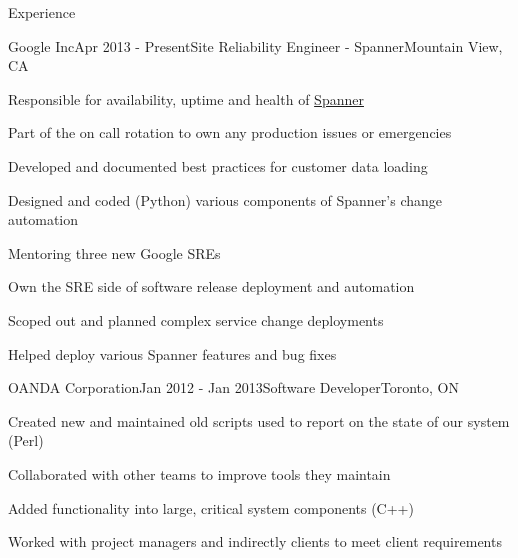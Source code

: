 \documentclass{resume}
\begin{document}
  \begin{rSection}{Experience}
    \begin{rSubsection}{Google Inc}{Apr 2013 - Present}{Site Reliability Engineer - Spanner}{Mountain View, CA}
      \item Responsible for availability, uptime and health of \href{https://en.wikipedia.org/wiki/Spanner_(database)}{Spanner}
      \item Part of the on call rotation to own any production issues or emergencies
      \item Developed and documented best practices for customer data loading
      \item Designed and coded (Python) various components of Spanner's change automation
      \item Mentoring three new Google SREs 
      \item Own the SRE side of software release deployment and automation
      \item Scoped out and planned complex service change deployments
      \item Helped deploy various Spanner features and bug fixes
    \end{rSubsection}

    \begin{rSubsection}{OANDA Corporation}{Jan 2012 - Jan 2013}{Software Developer}{Toronto, ON}
      \item Created new and maintained old scripts used to report on the state of our system (Perl)
      \item Collaborated with other teams to improve tools they maintain
      \item Added functionality into large, critical system components (C++)
      \item Worked with project managers and indirectly clients to meet client requirements
    \end{rSubsection}

\begin{comment}
    \begin{rSubsection}{OANDA Corporation}{Jan 2012 - Mar 2012}{Integrator}{Toronto, ON}
      \item Deployed software packages in a testing environment
      \item Detected and stopped bugs before software reached production machines
      \item Learned the software system on a broad, high level
      \item Interacted and collaborated with members of many other teams across
    \end{rSubsection}
\end{comment}


\end{rSection}
\end{document}
